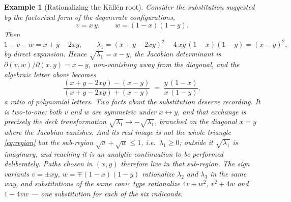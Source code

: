 \documentclass[11pt]{article}
\newtheorem{example}[definition]{Example}
\begin{document}
\begin{example}[Rationalizing the K\"all\'en root]
\label{ex:kallenchart}
Consider the substitution suggested by the factorized form of the
degenerate configurations,
\begin{equation}
  v = x\,y, \qquad w = (1-x)(1-y) .
\end{equation}
Then
\begin{equation}
  1 - v - w = x + y - 2xy,
  \qquad
  \lambda_1 = (x+y-2xy)^2 - 4\,xy\,(1{-}x)(1{-}y)
  = (x-y)^2 ,
\end{equation}
by direct expansion.  Hence $\sqrt{\lambda_1} = x - y$, the
Jacobian determinant is $\partial(v,w)/\partial(x,y) = x - y$,
non-vanishing away from the diagonal, and the algebraic letter above
becomes
\begin{equation}
  \frac{(x+y-2xy)-(x-y)}{(x+y-2xy)+(x-y)}
  \;=\; \frac{y\,(1-x)}{x\,(1-y)} ,
\end{equation}
a ratio of polynomial letters.  Two facts about the substitution
deserve recording.  It is two-to-one: both $v$ and $w$ are symmetric
under $x \leftrightarrow y$, and that exchange is precisely the deck
transformation $\sqrt{\lambda_1} \to -\sqrt{\lambda_1}$, branched on
the diagonal $x = y$ where the Jacobian vanishes.  And its real
image is not the whole triangle \eqref{eq:region} but the
sub-region $\sqrt v + \sqrt w \le 1$, i.e.\ $\lambda_1 \ge 0$;
outside it $\sqrt{\lambda_1}$ is imaginary, and reaching it is an
analytic continuation to be performed deliberately.  Paths chosen in
$(x,y)$ therefore live in that sub-region.  The sign variants
$v = \pm xy$, $w = \mp(1-x)(1-y)$ rationalize $\lambda_2$ and
$\lambda_3$ in the same way, and substitutions of the same conic
type rationalize $4v+w^2$, $v^2+4w$ and $1-4vw$ --- one
substitution for each of the six radicands.
\end{example}
\end{document}
